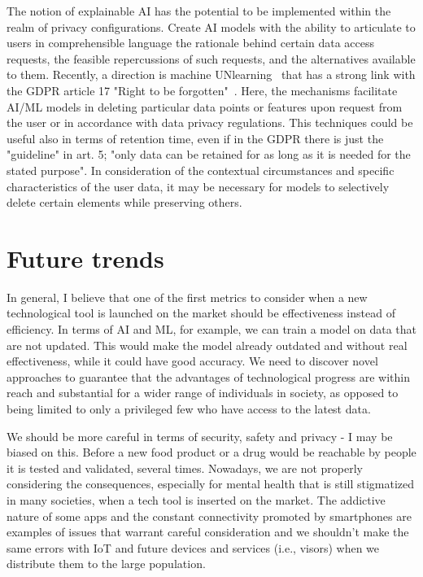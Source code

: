 \documentclass[11pt]{article}
\begin{document}
The notion of explainable AI has the potential to be implemented within the realm of privacy configurations. Create AI models with the ability to articulate to users in comprehensible language the rationale behind certain data access requests, the feasible repercussions of such requests, and the alternatives available to them. Recently, a direction is machine UNlearning~\cite{qu2023learn} that has a strong link with the GDPR article 17 "Right to be forgotten"~\cite{zhang2023llm}. Here, the mechanisms facilitate AI/ML models in deleting particular data points or features upon request from the user or in accordance with data privacy regulations. This techniques could be useful also in terms of retention time, even if in the GDPR there is just the "guideline" in art. 5; "only data can be retained for as long as it is needed for the stated purpose". In consideration of the contextual circumstances and specific characteristics of the user data, it may be necessary for models to selectively delete certain elements while preserving others.



\section{Future trends}
In general, I believe that one of the first metrics to consider when a new technological tool is launched on the market should be effectiveness instead of efficiency. In terms of AI and ML, for example, we can train a model on data that are not updated. This would make the model already outdated and without real effectiveness, while it could have good accuracy. We need to discover novel approaches to guarantee that the advantages of technological progress are within reach and substantial for a wider range of individuals in society, as opposed to being limited to only a privileged few who have access to the latest data. 


We should be more careful in terms of security, safety and privacy - I may be biased on this. Before a new food product or a drug would be reachable by people it is tested and validated, several times. Nowadays, we are not properly considering the consequences, especially for mental health that is still stigmatized in many societies, when a tech tool is inserted on the market. The addictive nature of some apps and the constant connectivity promoted by smartphones are examples of issues that warrant careful consideration and we shouldn't make the same errors with IoT and future devices and services (i.e., visors) when we distribute them to the large population. \newline 
\end{document}

